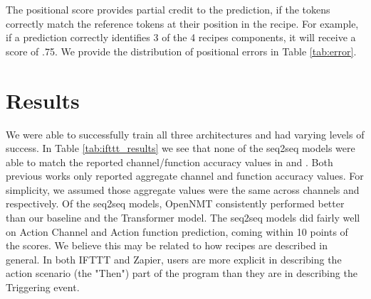 \documentclass[letterpaper]{article} %
\begin{document}
The positional score provides partial credit to the prediction, if the tokens correctly match the reference tokens at their position in the recipe. For example, if a prediction correctly identifies 3 of the 4 recipes components, it will receive a score of .75. We provide the distribution of positional errors in Table \ref{tab:error}.


\section{Results}

We were able to successfully train all three architectures and had varying levels of success. In Table \ref{tab:ifttt_results} we see that none of the seq2seq models were able to match the reported channel/function accuracy values in \citeauthor{chen2016latent} \citeyear{chen2016latent} and \citeauthor{beltagy-quirk-2016-improved} \citeyear{beltagy-quirk-2016-improved}. Both previous works only reported aggregate channel and function accuracy values. For simplicity, we assumed those aggregate values were the same across channels and  respectively. Of the seq2seq models, OpenNMT consistently performed better than our baseline and the Transformer model. The seq2seq models did fairly well on Action Channel and Action function prediction, coming within 10 points of the \citeauthor{chen2016latent} \citeyear{chen2016latent} scores. We believe this may be related to how recipes are described in general. In both IFTTT and Zapier, users are more explicit in describing the action scenario (the "Then") part of the program than they are in describing the Triggering event. 
\end{document}
